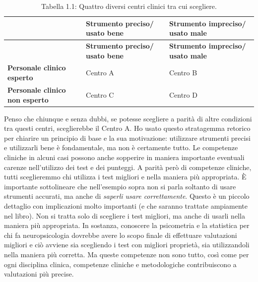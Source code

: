 \documentclass[
  italian,
  letterpaper,
  paper=6in:9in,
  pagesize=pdftex,
  headinclude=on,
  footinclude=on,
  11pt]{scrbook}
\begin{document}
\begingroup
{\footnotesize

\begin{longtable}[]{@{}
  >{\centering\arraybackslash}p{}
  >{\centering\arraybackslash}p{}
  >{\centering\arraybackslash}p{}@{}}
\caption{Tabella 1.1: Quattro diversi centri clinici tra cui
scegliere.}\tabularnewline
\toprule\noalign{}
\begin{minipage}[b]{\linewidth}\centering
\end{minipage} & \begin{minipage}[b]{\linewidth}\centering
\textbf{Strumento preciso/ usato bene }
\end{minipage} & \begin{minipage}[b]{\linewidth}\centering
\textbf{Strumento impreciso/ usato male}
\end{minipage} \\
\midrule\noalign{}
\endfirsthead
\toprule\noalign{}
\begin{minipage}[b]{\linewidth}\centering
\end{minipage} & \begin{minipage}[b]{\linewidth}\centering
\textbf{Strumento preciso/ usato bene }
\end{minipage} & \begin{minipage}[b]{\linewidth}\centering
\textbf{Strumento impreciso/ usato male}
\end{minipage} \\
\midrule\noalign{}
\endhead
\bottomrule\noalign{}
\endlastfoot
\textbf{Personale clinico esperto} & Centro A & Centro B \\
\textbf{Personale clinico non esperto} & Centro C & Centro D \\
\end{longtable}

}
\endgroup

Penso che chiunque e senza dubbi, se potesse scegliere a parità di altre
condizioni tra questi centri, sceglierebbe il Centro A. Ho usato questo
stratagemma retorico per chiarire un principio di base e la sua
motivazione: utilizzare strumenti precisi e utilizzarli bene è
fondamentale, ma non è certamente tutto. Le competenze cliniche in
alcuni casi possono anche sopperire in maniera importante eventuali
carenze nell'utilizzo dei test e dei punteggi. A parità però di
competenze cliniche, tutti sceglieremmo chi utilizza i test migliori e
nella maniera più appropriata. È importante sottolineare che
nell'esempio sopra non si parla soltanto di usare strumenti accurati, ma
anche di \emph{saperli usare correttamente}. Questo è un piccolo
dettaglio con implicazioni molto importanti (e che saranno trattate
ampiamente nel libro). Non si tratta solo di scegliere i test migliori,
ma anche di usarli nella maniera più appropriata. In sostanza, conoscere
la psicometria e la statistica per chi fa neuropsicologia dovrebbe avere
lo scopo finale di effettuare valutazioni migliori e ciò avviene sia
scegliendo i test con migliori proprietà, sia utilizzandoli nella
maniera più corretta. Ma queste competenze non sono tutto, così come per
ogni disciplina clinica, competenze cliniche e metodologiche
contribuiscono a valutazioni più precise.
\end{document}
